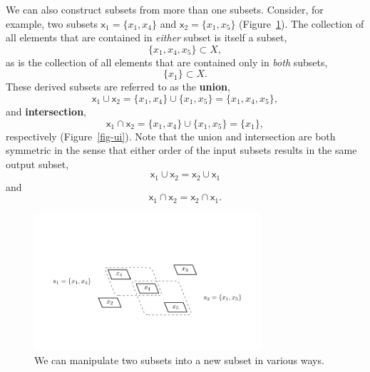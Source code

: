 \documentclass[
  letterpaper,
  DIV=11,
  numbers=noendperiod]{scrartcl}
\begin{document}
We can also construct subsets from more than one subsets. Consider, for
example, two subsets \(\mathsf{x}_1 = \{ x_{1}, x_{4} \}\) and
\(\mathsf{x}_2 = \{ x_{1}, x_{5} \}\) (Figure~\ref{fig-subsets}). The
collection of all elements that are contained in \emph{either} subset is
itself a subset, \[
\{ x_1, x_4, x_5 \} \subset X,
\] as is the collection of all elements that are contained only in
\emph{both} subsets, \[
\{ x_1 \} \subset X.
\] These derived subsets are referred to as the \textbf{union}, \[
\mathsf{x}_1 \cup \mathsf{x}_2
= \{ x_1, x_4 \} \cup \{ x_1, x_5 \}
= \{ x_1, x_4, x_5 \},
\] and \textbf{intersection}, \[
\mathsf{x}_1 \cap \mathsf{x}_2
= \{ x_1, x_4 \} \cup \{ x_1, x_5 \}
= \{ x_1 \},
\] respectively (Figure~\ref{fig-ui}). Note that the union and
intersection are both symmetric in the sense that either order of the
input subsets results in the same output subset, \[
\mathsf{x}_1 \cup \mathsf{x}_2 = \mathsf{x}_2 \cup \mathsf{x}_1
\] and \[
\mathsf{x}_1 \cap \mathsf{x}_2 = \mathsf{x}_2 \cap \mathsf{x}_1.
\]

\begin{figure}

{\centering \includegraphics[width=0.75\textwidth,height=\textheight]{figures/overlapping_subsets/overlapping_subsets.pdf}

}

\caption{\label{fig-subsets}We can manipulate two subsets into a new
subset in various ways.}

\end{figure}
\end{document}

